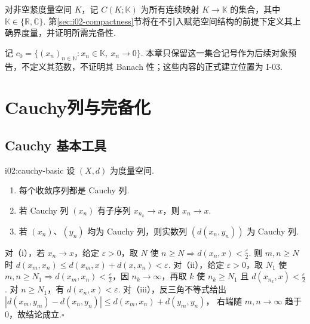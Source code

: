 \begin{FAExample}[连续函数的度量接口]
对非空紧度量空间 \(\displaystyle K\)，记 \(\displaystyle C(K;\mathbb K)\) 为所有连续映射 \(\displaystyle K\to\mathbb K\) 的集合，其中 \(\displaystyle \mathbb K\in\{\mathbb R,\mathbb C\}\). 第\ref{sec:i02-compactness}节将在不引入赋范空间结构的前提下定义其上确界度量，并证明所需完备性.
\end{FAExample}

\begin{FAExample}[仅作对象预告]
记 \(\displaystyle c_0=\{(x_n)_{n\in\mathbb N}:x_n\in\mathbb K,\ x_n\to0\}\). 本章只保留这一集合记号作为后续对象预告，不定义其范数，不证明其 Banach 性；这些内容的正式建立位置为 I-03.
\end{FAExample}

\section{Cauchy列与完备化}\label{sec:i02-completion}

\subsection{Cauchy 基本工具}

\begin{FALemma}{i02:cauchy-basic}
设 \(\displaystyle (X,d)\) 为度量空间.
\begin{enumerate}[label=\textup{(\roman*)}]
\item 每个收敛序列都是 Cauchy 列.
\item 若 Cauchy 列 \(\displaystyle (x_n)\) 有子序列 \(\displaystyle x_{n_k}\to x\)，则 \(\displaystyle x_n\to x\).
\item 若 \(\displaystyle (x_n)\)、\(\displaystyle (y_n)\) 均为 Cauchy 列，则实数列 \(\displaystyle (d(x_n,y_n))\) 为 Cauchy 列.
\end{enumerate}
\end{FALemma}

\begin{FAProof}
对（i），若 \(\displaystyle x_n\to x\)，给定 \(\displaystyle \varepsilon>0\)，取 \(\displaystyle N\) 使 \(\displaystyle n\geqslant N\Rightarrow d(x_n,x)<\frac{\varepsilon}{2}\). 则 \(\displaystyle m,n\geqslant N\) 时
\(\displaystyle d(x_m,x_n)\leqslant d(x_m,x)+d(x,x_n)<\varepsilon\).
对（ii），给定 \(\displaystyle \varepsilon>0\)，取 \(\displaystyle N_1\) 使 \(\displaystyle m,n\geqslant N_1\Rightarrow d(x_m,x_n)<\frac{\varepsilon}{2}\)，因 \(\displaystyle n_k\to\infty\)，再取 \(\displaystyle k\) 使 \(\displaystyle n_k\geqslant N_1\) 且 \(\displaystyle d(x_{n_k},x)<\frac{\varepsilon}{2}\). 对 \(\displaystyle n\geqslant N_1\)，有 \(\displaystyle d(x_n,x)<\varepsilon\). 对（iii），反三角不等式给出
\(\displaystyle |d(x_m,y_m)-d(x_n,y_n)|\leqslant d(x_m,x_n)+d(y_m,y_n)\)，
右端随 \(\displaystyle m,n\to\infty\) 趋于 \(\displaystyle0\)，故结论成立.\hfill\(\square\)
\end{FAProof}

